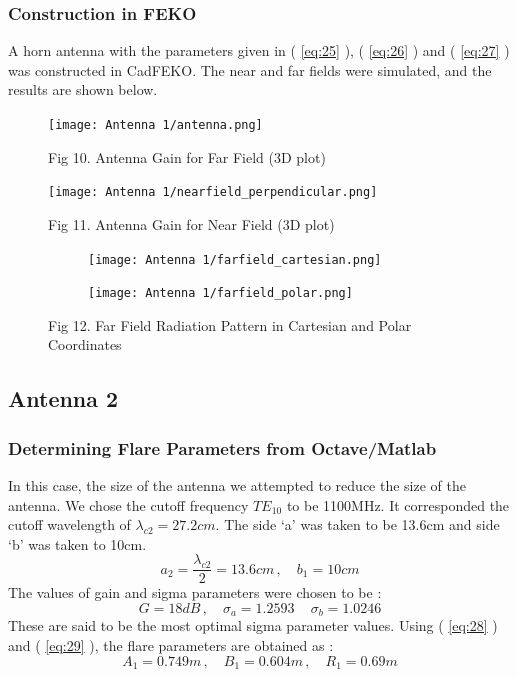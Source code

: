 \documentclass[12pt]{article}
\newcommand*{\myref}[1]{%
  \begingroup
    \hypersetup{
      linkcolor=linkequation,
      linkbordercolor=linkequation,
    }%
    \ref{#1}%
  \endgroup
}
\begin{document}
\subsubsection{Construction in FEKO}
A horn antenna with the parameters given in (\myref{eq:25}), (\myref{eq:26}) and (\myref{eq:27}) was constructed in CadFEKO. The near and far fields were simulated, and the results are shown below. 
\begin{figure}[H]
  \centering
  \texttt{[image: Antenna 1/antenna.png]}
  \caption{Fig 10. Antenna Gain for Far Field (3D plot)}
\end{figure}
\begin{figure}[H]
  \centering
  \texttt{[image: Antenna 1/nearfield\_perpendicular.png]}
  \caption{Fig 11. Antenna Gain for Near Field (3D plot)}
\end{figure}
\begin{figure} [H]
  \begin{subfigure}[b]{0.6\textwidth}
      \centering
      \texttt{[image: Antenna 1/farfield\_cartesian.png]}
  \end{subfigure}%
  \begin{subfigure}[b]{0.65\textwidth}
      \centering
      \texttt{[image: Antenna 1/farfield\_polar.png]}
  \end{subfigure}
  \caption{Fig 12. Far Field Radiation Pattern in Cartesian and Polar Coordinates}
\end{figure}
\subsection{Antenna 2}
\subsubsection{Determining Flare Parameters from Octave/Matlab}
In this case, the size of the antenna we attempted to reduce the size of the antenna. \linebreak
We chose the cutoff frequency $TE_{10}$ to be 1100MHz. It corresponded the cutoff wavelength of $\lambda_{c2}=27.2cm$. \linebreak
The side `a' was taken to be 13.6cm and side `b' was taken to 10cm. 
\begin{equation}
  a_2=\dfrac{\lambda_{c2}}{2}=13.6cm \, , \quad b_1=10cm \label{eq:28}
\end{equation}
The values of gain and sigma parameters were chosen to be :
\begin{equation}
  G=18dB\, , \quad \sigma_a=1.2593 \, \quad \sigma_b=1.0246 \label{eq:29}
\end{equation}
These are said to be the most optimal sigma parameter values. \linebreak
Using (\myref{eq:28}) and (\myref{eq:29}), the flare parameters are obtained as :
\begin{equation}
  A_1=0.749m \, , \quad B_1=0.604m \, , \quad R_1=0.69m \label{eq:30}
\end{equation}
\end{document}

